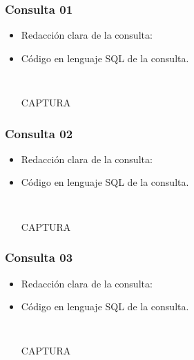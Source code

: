 \subsubsection*{Consulta 01}

\begin{itemize}
    \item Redacción clara de la consulta: 
    \item Código en lenguaje SQL de la consulta.
    
    \begin{lstlisting}[caption={Tablas para la BdDatos}, label={lst:sql_estadios}]
    
    \end{lstlisting}    

    \begin{center}
      CAPTURA
    \end{center}
    
\end{itemize}


\subsubsection*{Consulta 02}

\begin{itemize}
    \item Redacción clara de la consulta: 
    \item Código en lenguaje SQL de la consulta.
    
    \begin{lstlisting}[caption={Tablas para la BdDatos}, label={lst:sql_estadios}]
    
    \end{lstlisting}    

    \begin{center}
      CAPTURA
    \end{center}
    
\end{itemize}


\subsubsection*{Consulta 03}

\begin{itemize}
    \item Redacción clara de la consulta: 
    \item Código en lenguaje SQL de la consulta.
    
    \begin{lstlisting}[caption={Tablas para la BdDatos}, label={lst:sql_estadios}]
    
    \end{lstlisting}    

    \begin{center}
      CAPTURA
    \end{center}
    
\end{itemize}


